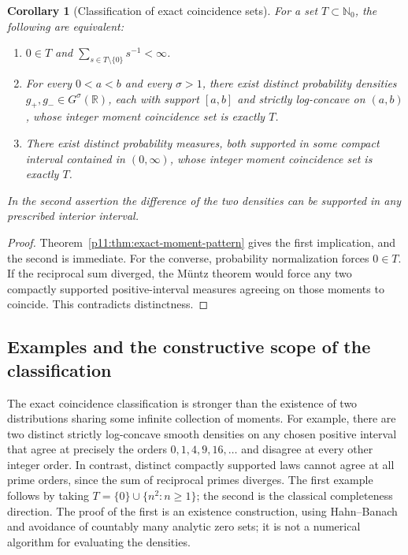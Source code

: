 \documentclass[11pt,letterpaper]{article}
\newtheorem{corollary}[theorem]{Corollary}
\theoremstyle{definition}
\theoremstyle{remark}
\newcommand{\1}{\mathbf 1}
\begin{document}
\begin{corollary}[Classification of exact coincidence sets]
\label{p11:cor:coincidence-classification}
For a set $T\subset\mathbb N_0$, the following are equivalent:
\begin{enumerate}
\item $0\in T$ and $\sum_{s\in T\setminus\{0\}}s^{-1}<\infty$.
\item For every $0<a<b$ and every $\sigma>1$, there exist distinct
probability densities $g_+,g_-\in G^\sigma(\mathbb R)$, each with
support $[a,b]$ and strictly log-concave on $(a,b)$, whose integer moment
coincidence set is exactly $T$.
\item There exist distinct probability measures, both supported in
some compact interval contained in $(0,\infty)$, whose integer moment
coincidence set is exactly $T$.
\end{enumerate}
In the second assertion the difference of the two densities can be
supported in any prescribed interior interval.
\end{corollary}
\begin{proof}
Theorem~\ref{p11:thm:exact-moment-pattern} gives the first implication, and
the second is immediate. For the converse, probability normalization
forces $0\in T$. If the reciprocal sum diverged, the M\"untz theorem
would force any two compactly supported positive-interval measures
agreeing on those moments to coincide. This contradicts distinctness.
\end{proof}



\subsection{Examples and the constructive scope of the classification}

The exact coincidence classification is stronger than the existence
of two distributions sharing some infinite collection of moments.
For example, there are two distinct strictly log-concave smooth
densities on any chosen positive interval that agree at precisely
the orders $0,1,4,9,16,\ldots$ and disagree at every other integer order.
In contrast, distinct compactly supported laws cannot agree at all
prime orders, since the sum of reciprocal primes diverges.
The first example follows by taking $T=\{0\}\cup\{n^2:n\geq1\}$;
the second is the classical completeness direction.
The proof of the first is an existence construction, using
Hahn--Banach and avoidance of countably many analytic zero sets;
it is not a numerical algorithm for evaluating the densities.
\end{document}
